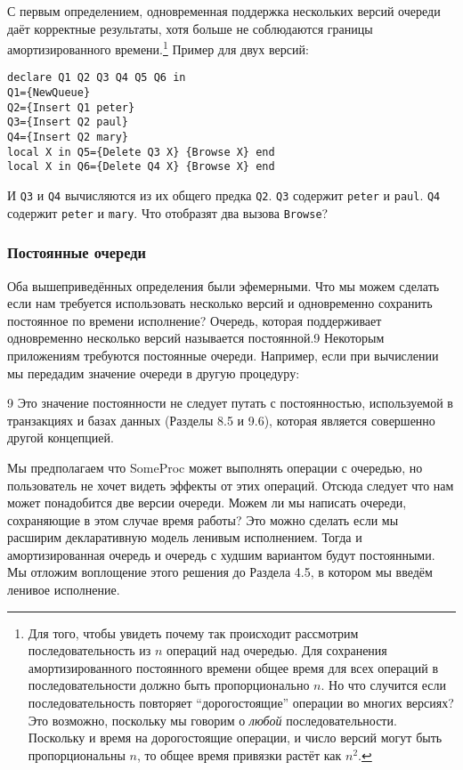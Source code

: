 С первым определением, одновременная поддержка нескольких версий очереди даёт корректные результаты, хотя больше не соблюдаются границы амортизированного времени.\footnote{Для того, чтобы увидеть почему так происходит рассмотрим последовательность из $n$ операций над очередью. Для сохранения амортизированного постоянного времени общее время для всех операций в последовательности должно быть пропорционально $n$. Но что случится если последовательность повторяет ``дорогостоящие'' операции во многих версиях? Это возможно, поскольку мы говорим о \emph{любой} последовательности. Поскольку и время на дорогостоящие операции, и число версий могут быть пропорциональны $n$, то общее время привязки растёт как $n^2$.} Пример для двух версий:

\begin{lstlisting}
declare Q1 Q2 Q3 Q4 Q5 Q6 in
Q1={NewQueue}
Q2={Insert Q1 peter}
Q3={Insert Q2 paul}
Q4={Insert Q2 mary}
local X in Q5={Delete Q3 X} {Browse X} end
local X in Q6={Delete Q4 X} {Browse X} end
\end{lstlisting}

И \lstinline!Q3! и \lstinline!Q4! вычисляются из их общего предка \lstinline!Q2!. \lstinline!Q3! содержит \lstinline!peter! и \lstinline!paul!. \lstinline!Q4! содержит \lstinline!peter! и \lstinline!mary!. Что отобразят два вызова \lstinline!Browse!?

\subsubsection{Постоянные очереди}

Оба вышеприведённых определения были эфемерными. Что мы можем сделать если нам требуется использовать несколько версий и одновременно сохранить постоянное по времени исполнение? Очередь, которая поддерживает одновременно несколько версий называется постоянной.9 Некоторым приложениям требуются постоянные очереди. Например, если при вычислении мы передадим значение очереди в другую процедуру:

9 Это значение постоянности не следует путать с постоянностью, используемой в транзакциях и базах данных (Разделы 8.5 и 9.6), которая является совершенно другой концепцией.

Мы предполагаем что SomeProc может выполнять операции с очередью, но пользователь не хочет видеть эффекты от этих операций. Отсюда следует что нам может понадобится две версии очереди. Можем ли мы написать очереди, сохраняющие в этом случае время работы? Это можно сделать если мы расширим декларативную модель ленивым исполнением. Тогда и амортизированная очередь и очередь с худшим вариантом будут постоянными. Мы отложим воплощение этого решения до Раздела 4.5, в котором мы введём ленивое исполнение.

